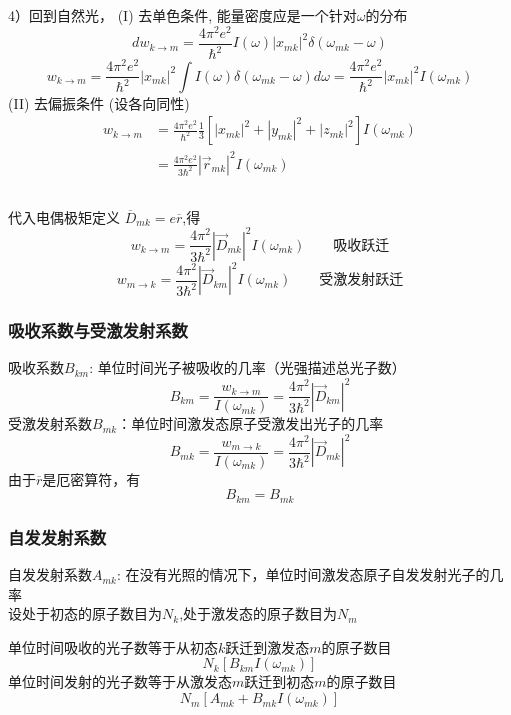 \begin{frame} 
  \frametitle{}
  4）回到自然光， (I) 去单色条件, 能量密度应是一个针对$\omega$的分布
  \[ d w_{k\to m} = \frac{4\pi ^2 e^2 }{\hbar^2} I(\omega) \left\vert x_{mk} \right\vert ^2 \delta( \omega _{mk} - \omega)\]
  \[ w_{k\to m} = \frac{4\pi ^2 e^2 }{\hbar^2} \left\vert x_{mk} \right\vert ^2 \int I(\omega)  \delta( \omega _{mk} - \omega) d \omega  = \frac{4\pi ^2 e^2 }{\hbar^2} \left\vert x_{mk} \right\vert ^2 I(\omega _{mk})\]
  (II) 去偏振条件 (设各向同性)
  \[ 
   \begin{aligned}
     w_{k\to m} &= \frac{4\pi ^2 e^2 }{\hbar^2} \frac{1}{3}[\left\vert x_{mk} \right\vert ^2 + \left\vert y_{mk} \right\vert ^2 + \left\vert z_{mk} \right\vert ^2 ]I(\omega _{mk}) \\ 
     &= \frac{4\pi ^2 e^2 }{3\hbar^2} \left\vert \vec{r}_{mk} \right\vert ^2 I(\omega _{mk}) \\
   \end{aligned}
    \]
\end{frame} 

\begin{frame} 
  \frametitle{}
代入电偶极矩定义 $\overline{D}_{mk} = e \overline{r}$,得
\[ w_{k\to m} = \frac{4\pi ^2 }{3\hbar^2} \left\vert \vec{D}_{mk} \right\vert ^2 I(\omega _{mk}) \qquad \text{吸收跃迁} \]
\[ w_{m\to k} = \frac{4\pi ^2 }{3\hbar^2} \left\vert \vec{D}_{km} \right\vert ^2 I(\omega _{mk}) \qquad \text{受激发射跃迁} \]
\end{frame} 

\begin{frame} 
  \frametitle{吸收系数与受激发射系数}
  吸收系数$B_{km}$: 单位时间光子被吸收的几率（光强描述总光子数）\\
  \[ B_{km} = \frac{w_{k\to m}}{I(\omega _{mk})} = \frac{4\pi ^2 }{3\hbar^2} \left\vert \vec{D}_{km} \right\vert ^2 \]
  受激发射系数$B_{mk}$：单位时间激发态原子受激发出光子的几率
  \[ B_{mk} = \frac{w_{m\to k}}{I(\omega _{mk})} = \frac{4\pi ^2 }{3\hbar^2} \left\vert \vec{D}_{mk} \right\vert ^2 \]
  由于$\overline{r}$是厄密算符，有 
  \[ B_{km} =  B_{mk} \]
\end{frame}

\begin{frame} 
  \frametitle{自发发射系数}
  自发发射系数$A_{mk}$: 在没有光照的情况下，单位时间激发态原子自发发射光子的几率 \\
设处于初态的原子数目为$N_k$,处于激发态的原子数目为$N_m$ \\
\begin{itemize}
  \Item 单位时间吸收的光子数等于从初态$k$跃迁到激发态$m$的原子数目
         \[N_k[B_{km}I(\omega _{mk})] \]
  \Item 单位时间发射的光子数等于从激发态$m$跃迁到初态$m$的原子数目 
        \[N_m[A_{mk} + B_{mk}I(\omega _{mk})] \]
\end{itemize}
\end{frame} 

